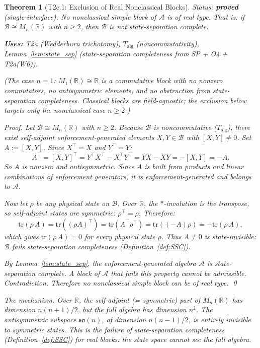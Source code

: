 \documentclass[11pt,a4paper]{article}
\newtheorem{theorem}{Theorem}[section]
\theoremstyle{definition}
\newcommand{\tr}{\mathrm{tr}}
\begin{document}
\begin{theorem}[T2c.1: Exclusion of Real Nonclassical Blocks]\label{thm:T2c1}
\textit{Status: \textbf{proved} (single-interface).}  No nonclassical simple block of $\mathcal{A}$ is of real type.  That is: if $\mathcal{B} \cong M_n(\mathbb{R})$ with $n \ge 2$, then $\mathcal{B}$ is not state-separation complete.

\smallskip\noindent\textbf{Uses:} T2a (Wedderburn trichotomy), $T_{\mathrm{alg}}$ (noncommutativity), Lemma~\ref{lem:state_sep} (state-separation completeness from SP + O4 + T2a(W6)).

\smallskip\noindent\textit{(The case $n = 1$: $M_1(\mathbb{R}) \cong \mathbb{R}$ is a commutative block with no nonzero commutators, no antisymmetric elements, and no obstruction from state-separation completeness.  Classical blocks are field-agnostic; the exclusion below targets only the nonclassical case $n \ge 2$.)}

\smallskip\noindent\textit{Proof.}
Let $\mathcal{B} \cong M_n(\mathbb{R})$ with $n \ge 2$.  Because $\mathcal{B}$ is noncommutative ($T_{\mathrm{alg}}$), there exist self-adjoint enforcement-generated elements $X, Y \in \mathcal{B}$ with $[X, Y] \ne 0$.  Set $A := [X, Y]$.  Since $X^\top = X$ and $Y^\top = Y$:
\[
A^\top = [X,Y]^\top = Y^\top X^\top - X^\top Y^\top = YX - XY = -[X,Y] = -A.
\]
So $A$ is nonzero and antisymmetric.  Since $A$ is built from products and linear combinations of enforcement generators, it is enforcement-generated and belongs to $\mathcal{A}$.

Now let $\rho$ be any physical state on $\mathcal{B}$.  Over $\mathbb{R}$, the $*$-involution is the transpose, so self-adjoint states are symmetric: $\rho^\top = \rho$.  Therefore:
\[
\tr(\rho\,A) = \tr((\rho A)^\top) = \tr(A^\top \rho^\top) = \tr((-A)\rho) = -\tr(\rho\,A),
\]
which gives $\tr(\rho\,A) = 0$ for every physical state $\rho$.  Thus $A \ne 0$ is state-invisible: $\mathcal{B}$ fails state-separation completeness (Definition~\ref{def:SSC}).

By Lemma~\ref{lem:state_sep}, the enforcement-generated algebra $\mathcal{A}$ \emph{is} state-separation complete.  A block of $\mathcal{A}$ that fails this property cannot be admissible.  Contradiction.  Therefore no nonclassical simple block can be of real type.  \qed

\smallskip\noindent\textit{The mechanism.}  Over $\mathbb{R}$, the self-adjoint (= symmetric) part of $M_n(\mathbb{R})$ has dimension $n(n+1)/2$, but the full algebra has dimension $n^2$.  The antisymmetric subspace $\mathfrak{so}(n)$, of dimension $n(n-1)/2$, is entirely invisible to symmetric states.  This is the failure of state-separation completeness (Definition~\ref{def:SSC}) for real blocks: the state space cannot see the full algebra.
\end{theorem}
\end{document}
